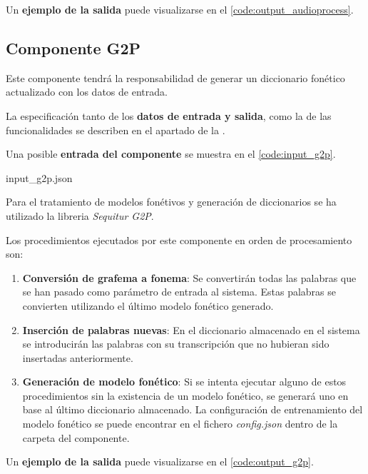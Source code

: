 \documentclass[../main.tex]{subfiles}
\begin{document}
Un \textbf{ejemplo de la salida} puede visualizarse en el \autoref{code:output_audioprocess}.



\subsection{Componente G2P}\label{subsec:impl_g2p}
Este componente tendrá la responsabilidad de generar un diccionario fonético actualizado con los datos de entrada.

La especificación tanto de los \textbf{datos de entrada y salida}, como la de las funcionalidades se describen en el apartado  de la .

Una posible \textbf{entrada del componente} se muestra en el \autoref{code:input_g2p}.

                {input_g2p.json}

Para el tratamiento de modelos fonétivos y generación de diccionarios se ha utilizado la libreria \textit{Sequitur G2P}.

Los procedimientos ejecutados por este componente en orden de procesamiento son:
\begin{enumerate}
    \item \textbf{Conversión de grafema a fonema}: Se convertirán todas las palabras que se han pasado como parámetro de entrada al sistema. Estas palabras se convierten utilizando el último modelo fonético generado.
    \item \textbf{Inserción de palabras nuevas}: En el diccionario almacenado en el sistema se introducirán las palabras con su transcripción que no hubieran sido insertadas anteriormente.
    \item \textbf{Generación de modelo fonético}: Si se intenta ejecutar alguno de estos procedimientos sin la existencia de un modelo fonético, se generará uno en base al último diccionario almacenado. La configuración de entrenamiento del modelo fonético se puede encontrar en el fichero \textit{config.json} dentro de la carpeta del componente.
\end{enumerate}

Un \textbf{ejemplo de la salida} puede visualizarse en el \autoref{code:output_g2p}.
\end{document}

